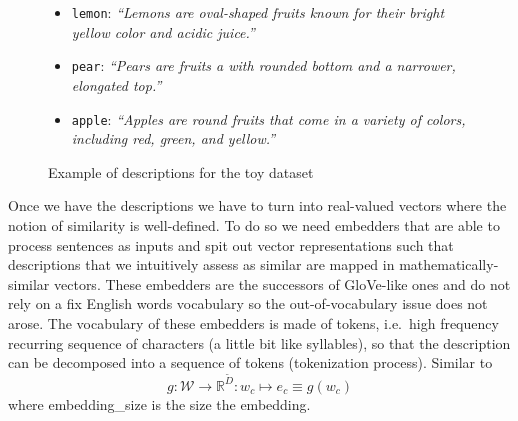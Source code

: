 \begin{figure}[htbp]
  \begin{minipage}{\textwidth}
    \begin{itemize}
      \item \texttt{lemon}: \emph{\small``Lemons are \alert{oval-shaped} fruits known for their \alert{bright yellow} color and acidic juice.''}
      \item \texttt{pear}: \emph{\small``Pears are fruits a with \alert{rounded bottom} and a narrower, \alert{elongated top}.''}
      \item \texttt{apple}: \emph{\small``Apples are \alert{round} fruits that come in a variety of colors, including \alert{red}, \alert{green}, and \alert{yellow}.''}
    \end{itemize}
    \caption{Example of descriptions for the toy dataset}
    \label{fig:descriptions}
  \end{minipage}
\end{figure}

Once we have the descriptions we have to turn into real-valued vectors where the notion of similarity is well-defined. To do so we need embedders that are able to process sentences as inputs and spit out vector representations such that descriptions that we intuitively assess as similar are mapped in mathematically-similar vectors. These embedders are the successors of GloVe-like ones and do not rely on a fix English words vocabulary so the out-of-vocabulary issue does not arose. The vocabulary of these embedders is made of tokens, i.e.\ high frequency recurring sequence of characters (a little bit like syllables), so that the description can be decomposed into a sequence of tokens (tokenization process).
Similar to~
\begin{equation}
  g : \mathcal{W} \to \mathbb{R}^{\tilde{D}} :
  w_c \mapsto e_c \equiv g(w_c)
  \label{eq:desc-embedding}
\end{equation}
where \gls{embedding_size} is the size the embedding.\\

